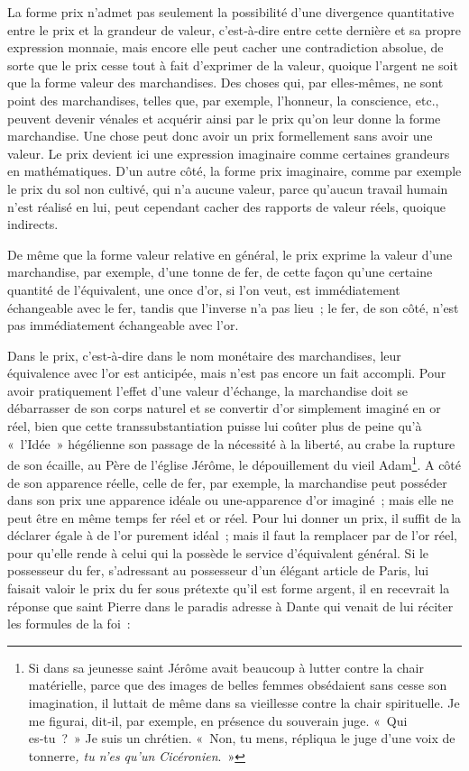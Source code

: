 \documentclass[french,twoside]{book} %
\begin{document}
La forme prix n’admet pas seulement la possibilité d’une divergence quantitative entre le prix et la grandeur de valeur, c’est‑à-dire entre cette dernière et sa propre expression monnaie, mais encore elle peut cacher une contradiction absolue, de sorte que le prix cesse tout à fait d’exprimer de la valeur, quoique l’argent ne soit que la forme valeur des marchandises. Des choses qui, par elles‑mêmes, ne sont point des marchandises, telles que, par exemple, l’honneur, la conscience, etc., peuvent devenir vénales et acquérir ainsi par le prix qu’on leur donne la forme marchandise. Une chose peut donc avoir un prix formellement sans avoir une valeur. Le prix devient ici une expression imaginaire comme certaines grandeurs en mathématiques. D’un autre côté, la forme prix imaginaire, comme par exemple le prix du sol non cultivé, qui n’a aucune valeur, parce qu’aucun travail humain n’est réalisé en lui, peut cependant cacher des rapports de valeur réels, quoique indirects.\par
De même que la forme valeur relative en général, le prix exprime la valeur d’une marchandise, par exemple, d’une tonne de fer, de cette façon qu’une certaine quantité de l’équivalent, une once d’or, si l’on veut, est immédiatement échangeable avec le fer, tandis que l’inverse n’a pas lieu ; le fer, de son côté, n’est pas immédiatement échangeable avec l’or.\par
Dans le prix, c’est‑à‑dire dans le nom monétaire des marchandises, leur équivalence avec l’or est anticipée, mais n’est pas encore un fait accompli. Pour avoir pratiquement l’effet d’une valeur d’échange, la marchandise doit se débarrasser de son corps naturel et se convertir d’or simplement imaginé en or réel, bien que cette transsubstantiation puisse lui coûter plus de peine qu’à « l’Idée » hégélienne son passage de la nécessité à la liberté, au crabe la rupture de son écaille, au Père de l’église Jérôme, le dépouillement du vieil Adam\footnote{Si dans sa jeunesse saint Jérôme avait beaucoup à lutter contre la chair matérielle, parce que des images de belles femmes obsédaient sans cesse son imagination, il luttait de même dans sa vieillesse contre la chair spirituelle. Je me figurai, dit‑il, par exemple, en présence du souverain juge. « Qui es‑tu ? » Je suis un chrétien. « Non, tu mens, répliqua le juge d’une voix de tonnerre\emph{, tu n’es qu’un Cicéronien}. »}. A côté de son apparence réelle, celle de fer, par exemple, la marchandise peut posséder dans son prix une apparence idéale ou une‑apparence d’or imaginé ; mais elle ne peut être en même temps fer réel et or réel. Pour lui donner un prix, il suffit de la déclarer égale à de l’or purement idéal ; mais il faut la remplacer par de l’or réel, pour qu’elle rende à celui qui la possède le service d’équivalent général. Si le possesseur du fer, s’adressant au possesseur d’un élégant article de Paris, lui faisait valoir le prix du fer sous prétexte qu’il est forme argent, il en recevrait la réponse que saint Pierre dans le paradis adresse à Dante qui venait de lui réciter les formules de la foi :\par
\end{document}
